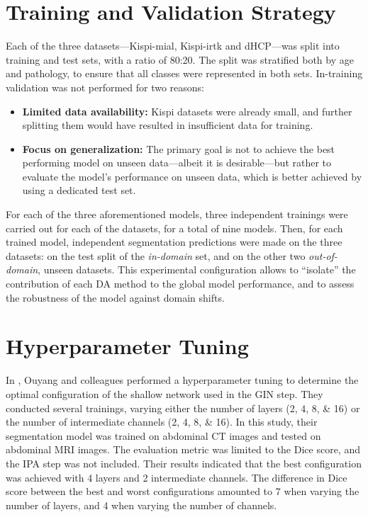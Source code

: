 \section{Training and Validation Strategy} \label{sec:TrainingAndValidationStrategy}
Each of the three datasets---Kispi-mial, Kispi-irtk and dHCP---was split into training and test sets, with a ratio of \num{80}:\num{20}. The split was stratified both by age and pathology, to ensure that all classes were represented in both sets. In-training validation was not performed for two reasons:
\begin{itemize}
    \item \textbf{Limited data availability:} Kispi datasets were already small, and further splitting them would have resulted in insufficient data for training.
    \item \textbf{Focus on generalization:} The primary goal is not to achieve the best performing model on unseen data---albeit it is desirable---but rather to evaluate the model's performance on unseen data, which is better achieved by using a dedicated test set.
\end{itemize}

For each of the three aforementioned models, three independent trainings were carried out for each of the datasets, for a total of nine models. Then, for each trained model, independent segmentation predictions were made on the three datasets: on the test split of the \textit{in-domain} set, and on the other two \textit{out-of-domain}, unseen datasets. This experimental configuration allows to \enquote{isolate} the contribution of each DA method to the global model performance, and to assess the robustness of the model against domain shifts.

\section{Hyperparameter Tuning} \label{sec:HyperparameterTuning}
In \cite{Ouyang2023}, Ouyang and colleagues performed a hyperparameter tuning to determine the optimal configuration of the shallow network used in the GIN step. They conducted several trainings, varying either the number of layers (\numlist[list-final-separator={ or }]{2;4;8;16}) or the number of intermediate channels (\numlist[list-final-separator={ or }]{2;4;8;16}). In this study, their segmentation model was trained on abdominal CT images and tested on abdominal MRI images. The evaluation metric was limited to the Dice score, and the IPA step was not included. Their results indicated that the best configuration was achieved with \num{4} layers and \num{2} intermediate channels. The difference in Dice score between the best and worst configurations amounted to \num{7} when varying the number of layers, and \num{4} when varying the number of channels.

